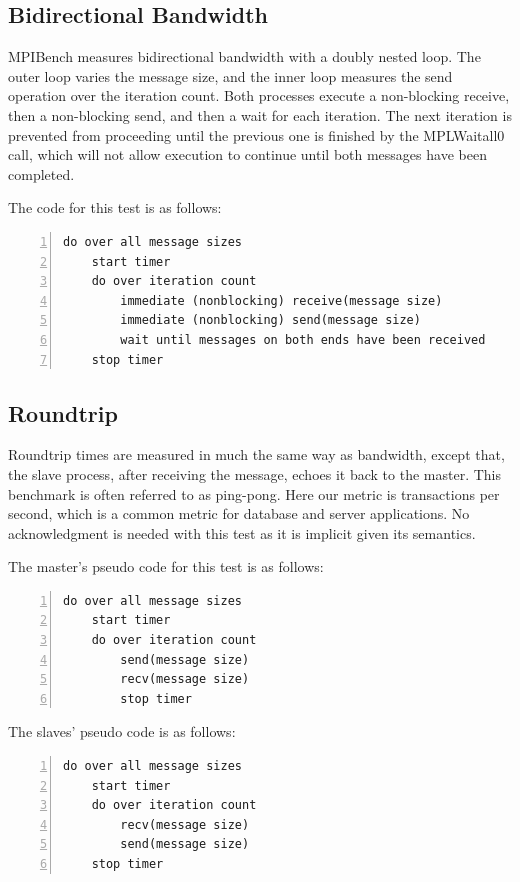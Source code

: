 \subsection{Bidirectional Bandwidth}

MPIBench measures bidirectional bandwidth with a doubly nested loop. The outer
loop varies the message size, and the inner loop measures the send operation
over the iteration count. Both processes execute a non-blocking receive, then a
non-blocking send, and then a wait for each iteration. The next iteration is
prevented from proceeding until the previous one is finished by the MPLWaitall0
call, which will not allow execution to continue until both messages have been
completed.

The code for this test is as follows:
 
\begin{lstlisting}[frame=single,numbers=left]
 do over all message sizes
    start timer
    do over iteration count
        immediate (nonblocking) receive(message size)
        immediate (nonblocking) send(message size)
        wait until messages on both ends have been received
    stop timer
\end{lstlisting}


\subsection{Roundtrip}

Roundtrip times are measured in much the same way as bandwidth, except that,
the slave process, after receiving the message, echoes it back to the master.
This benchmark is often referred to as ping-pong. Here our metric is
transactions per second, which is a common metric for database and server
applications. No acknowledgment is needed with this test as it is implicit
given its semantics.

The master's pseudo code for this test is as follows:

\begin{lstlisting}[frame=single,numbers=left]
  do over all message sizes 
    start timer
    do over iteration count
        send(message size)
        recv(message size) 
        stop timer
\end{lstlisting}

The slaves' pseudo code is as follows:

\begin{lstlisting}[frame=single,numbers=left]
do over all message sizes 
    start timer
    do over iteration count
        recv(message size)
        send(message size)
    stop timer
\end{lstlisting}

